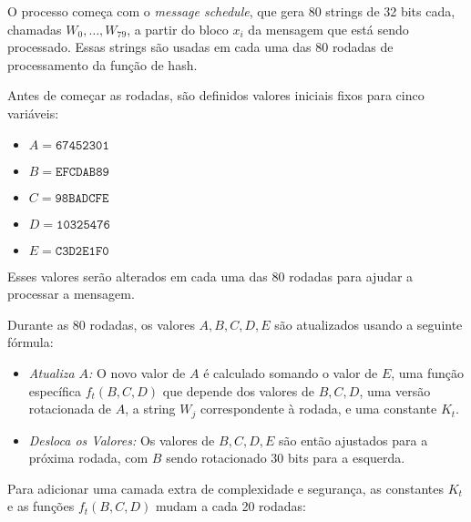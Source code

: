 O processo começa com o \textit{message schedule}, que gera 80 strings de 32 bits cada, chamadas $W_0, \dots, W_{79}$, a partir do bloco $x_i$ da mensagem que está sendo processado.
Essas strings são usadas em cada uma das 80 rodadas de processamento da função de hash.

Antes de começar as rodadas, são definidos valores iniciais fixos para cinco variáveis: 

\begin{itemize}
  \item $A = \texttt{67452301}$
  \item $B = \texttt{EFCDAB89}$
  \item $C = \texttt{98BADCFE}$
  \item $D = \texttt{10325476}$
  \item $E = \texttt{C3D2E1F0}$
\end{itemize}

Esses valores serão alterados em cada uma das 80 rodadas para ajudar a processar a mensagem.

Durante as 80 rodadas, os valores $A, B, C, D, E$ são atualizados usando a seguinte fórmula:

\begin{itemize}
\item[] {\em Atualiza $A$:}
  O novo valor de $A$ é calculado somando o valor de $E$, uma função específica $f_t(B,C,D)$ que depende dos valores de $B, C, D$, uma versão rotacionada de $A$, a string $W_j$ correspondente à rodada, e uma constante $K_t$.
\item[] {\em Desloca os Valores:}
  Os valores de $B, C, D, E$ são então ajustados para a próxima rodada, com $B$ sendo rotacionado 30 bits para a esquerda.
\end{itemize}

Para adicionar uma camada extra de complexidade e segurança, as constantes $K_t$ e as funções $f_t(B,C,D)$ mudam a cada 20 rodadas:

